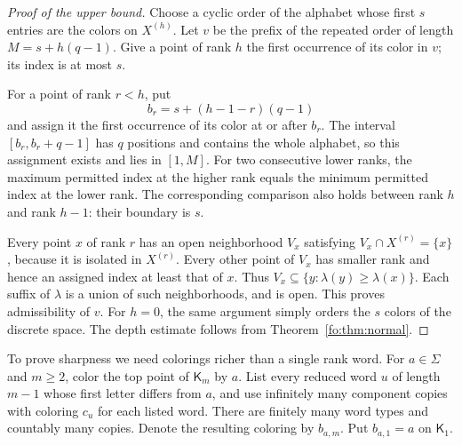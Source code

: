 \documentclass[11pt,letterpaper]{article}
\numberwithin{equation}{section}
\theoremstyle{definition}
\theoremstyle{remark}
\theoremstyle{definition}
\newcommand{\Tw}{\mathsf K}
\begin{document}
\begin{proof}[Proof of the upper bound]
Choose a cyclic order of the alphabet whose first $s$ entries are the colors
on $X^{(h)}$. Let $v$ be the prefix of the repeated order of length
$M=s+h(q-1)$. Give a point of rank $h$ the first occurrence of its color in $v$;
its index is at most $s$.

For a point of rank $r<h$, put
\[
 b_r=s+(h-1-r)(q-1)
\]
and assign it the first occurrence of its color at or after $b_r$. The interval
$[b_r,b_r+q-1]$ has $q$ positions and contains the whole alphabet, so this
assignment exists and lies in $[1,M]$. For two consecutive lower ranks, the
maximum permitted index at the higher rank equals the minimum permitted index
at the lower rank. The corresponding comparison also holds between rank $h$
and rank $h-1$: their boundary is $s$.

Every point $x$ of rank $r$ has an open neighborhood $V_x$ satisfying
$V_x\cap X^{(r)}=\{x\}$, because it is isolated in $X^{(r)}$. Every other point
of $V_x$ has smaller rank and hence an assigned index at least that of $x$.
Thus $V_x\subseteq\{y:\lambda(y)\ge\lambda(x)\}$. Each suffix of $\lambda$ is
a union of such neighborhoods, and is open. This proves admissibility of $v$.
For $h=0$, the same argument simply orders the $s$ colors of the discrete space.
The depth estimate follows from Theorem~\ref{fo:thm:normal}.
\end{proof}

To prove sharpness we need colorings richer than a single rank word. For
$a\in\Sigma$ and $m\ge2$, color the top point of $\Tw_m$ by $a$. List every
reduced word $u$ of length $m-1$ whose first letter differs from $a$, and use
infinitely many component copies with coloring $c_u$ for each listed word.
There are finitely many word types and countably many copies. Denote the
resulting coloring by $b_{a,m}$. Put $b_{a,1}=a$ on $\Tw_1$.
\end{document}
